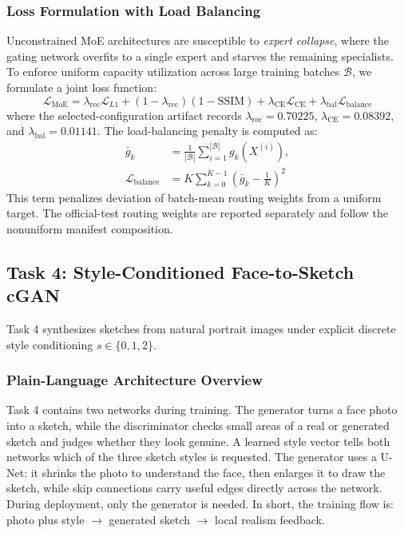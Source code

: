 \documentclass[journal,compsoc]{IEEEtran}
\begin{document}
\subsubsection{Loss Formulation with Load Balancing}
Unconstrained MoE architectures are susceptible to \textit{expert collapse}, where the gating network overfits to a single expert and starves the remaining specialists. To enforce uniform capacity utilization across large training batches $\mathcal{B}$, we formulate a joint loss function:
\begin{equation}
    \mathcal{L}_{\text{MoE}} = \lambda_{\text{rec}} \mathcal{L}_{L1} + (1-\lambda_{\text{rec}})(1-\text{SSIM}) + \lambda_{\text{CE}}\mathcal{L}_{\text{CE}} + \lambda_{\text{bal}}\mathcal{L}_{\text{balance}}
\end{equation}
where the selected-configuration artifact records $\lambda_{\text{rec}}=0.70225$, $\lambda_{\text{CE}}=0.08392$, and $\lambda_{\text{bal}}=0.01141$. The load-balancing penalty is computed as:
\begin{equation}
\begin{aligned}
    \bar{g}_k &= \frac{1}{|\mathcal{B}|} \sum_{i=1}^{|\mathcal{B}|} g_k(X^{(i)}), \\
    \mathcal{L}_{\text{balance}} &= K \sum_{k=0}^{K-1} \left(\bar{g}_k - \frac{1}{K}\right)^2
\end{aligned}
\end{equation}
This term penalizes deviation of batch-mean routing weights from a uniform target. The official-test routing weights are reported separately and follow the nonuniform manifest composition.

\subsection{Task 4: Style-Conditioned Face-to-Sketch cGAN}
Task 4 synthesizes sketches from natural portrait images under explicit discrete style conditioning $s \in \{0, 1, 2\}$.

\subsubsection{Plain-Language Architecture Overview}
Task 4 contains two networks during training. The generator turns a face photo into a sketch, while the discriminator checks small areas of a real or generated sketch and judges whether they look genuine. A learned style vector tells both networks which of the three sketch styles is requested. The generator uses a U-Net: it shrinks the photo to understand the face, then enlarges it to draw the sketch, while skip connections carry useful edges directly across the network. During deployment, only the generator is needed. In short, the training flow is: photo plus style $\rightarrow$ generated sketch $\rightarrow$ local realism feedback.
\end{document}
